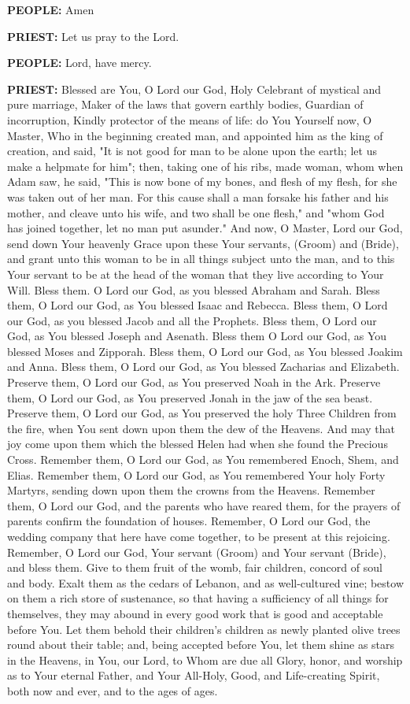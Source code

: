 \textbf{PEOPLE:} Amen

\textbf{PRIEST:} Let us pray to the Lord.

\textbf{PEOPLE:} Lord, have mercy.

\textbf{PRIEST:} Blessed are You, O Lord our God, Holy Celebrant of
mystical and pure marriage, Maker of the laws that govern earthly
bodies, Guardian of incorruption, Kindly protector of the means of life:
do You Yourself now, O Master, Who in the beginning created man, and
appointed him as the king of creation, and said, "It is not good for man
to be alone upon the earth; let us make a helpmate for him"; then,
taking one of his ribs, made woman, whom when Adam saw, he said, "This
is now bone of my bones, and flesh of my flesh, for she was taken out of
her man. For this cause shall a man forsake his father and his mother,
and cleave unto his wife, and two shall be one flesh," and "whom God has
joined together, let no man put asunder." And now, O Master, Lord our
God, send down Your heavenly Grace upon these Your servants, (Groom) and
(Bride), and grant unto this woman to be in all things subject unto the
man, and to this Your servant to be at the head of the woman that they
live according to Your Will. Bless them. O Lord our God, as you blessed
Abraham and Sarah. Bless them, O Lord our God, as You blessed Isaac and
Rebecca. Bless them, O Lord our God, as you blessed Jacob and all the
Prophets. Bless them, O Lord our God, as You blessed Joseph and Asenath.
Bless them O Lord our God, as You blessed Moses and Zipporah. Bless
them, O Lord our God, as You blessed Joakim and Anna. Bless them, O Lord
our God, as You blessed Zacharias and Elizabeth. Preserve them, O Lord
our God, as You preserved Noah in the Ark. Preserve them, O Lord our
God, as You preserved Jonah in the jaw of the sea beast. Preserve them,
O Lord our God, as You preserved the holy Three Children from the fire,
when You sent down upon them the dew of the Heavens. And may that joy
come upon them which the blessed Helen had when she found the Precious
Cross. Remember them, O Lord our God, as You remembered Enoch, Shem, and
Elias. Remember them, O Lord our God, as You remembered Your holy Forty
Martyrs, sending down upon them the crowns from the Heavens. Remember
them, O Lord our God, and the parents who have reared them, for the
prayers of parents confirm the foundation of houses. Remember, O Lord
our God, the wedding company that here have come together, to be present
at this rejoicing. Remember, O Lord our God, Your servant (Groom) and
Your servant (Bride), and bless them. Give to them fruit of the womb,
fair children, concord of soul and body. Exalt them as the cedars of
Lebanon, and as well-cultured vine; bestow on them a rich store of
sustenance, so that having a sufficiency of all things for themselves,
they may abound in every good work that is good and acceptable before
You. Let them behold their children's children as newly planted olive
trees round about their table; and, being accepted before You, let them
shine as stars in the Heavens, in You, our Lord, to Whom are due all
Glory, honor, and worship as to Your eternal Father, and Your All-Holy,
Good, and Life-creating Spirit, both now and ever, and to the ages of
ages.

